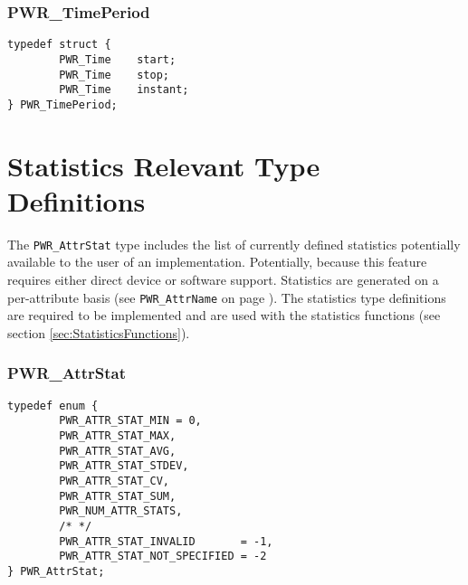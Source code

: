 \subsubsection{PWR_TimePeriod}\label{type:TimePeriod}

\begin{center}
\begin{minipage}{.95\linewidth}%
\begin{lstlisting}
typedef struct {
        PWR_Time    start;
        PWR_Time    stop;
        PWR_Time    instant;
} PWR_TimePeriod;
\end{lstlisting}
\end{minipage}
\end{center}

\section{Statistics Relevant Type Definitions}\label{sec:StatisticTypeDefinitions}
The \texttt{PWR_AttrStat} type includes the list of currently defined statistics potentially available to the user of an implementation.
Potentially, because this feature requires either direct device or software support.
Statistics are generated on a per-attribute basis (see \texttt{PWR_AttrName} on page \pageref{type:AttrName}). 
The statistics type definitions are required to be implemented and are used with the statistics functions (see section \ref{sec:StatisticsFunctions}).


\subsubsection{PWR_AttrStat}\label{type:AttrStat}

\begin{center}
\begin{minipage}{.95\linewidth}%
\begin{lstlisting}
typedef enum {
        PWR_ATTR_STAT_MIN = 0,
        PWR_ATTR_STAT_MAX,
        PWR_ATTR_STAT_AVG,
        PWR_ATTR_STAT_STDEV,
        PWR_ATTR_STAT_CV,
        PWR_ATTR_STAT_SUM,
        PWR_NUM_ATTR_STATS,
        /* */
        PWR_ATTR_STAT_INVALID       = -1,
        PWR_ATTR_STAT_NOT_SPECIFIED = -2
} PWR_AttrStat;
\end{lstlisting}
\end{minipage}
\end{center}

